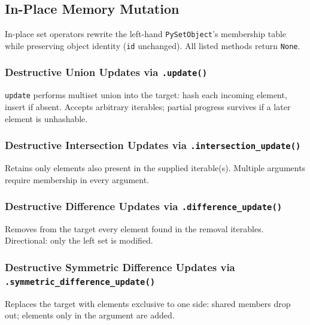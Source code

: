 \subsection{In-Place Memory Mutation}

In-place set operators rewrite the left-hand \texttt{PySetObject}'s membership table while preserving object identity (\texttt{id} unchanged). All listed methods return \texttt{None}.

\subsubsection{Destructive Union Updates via \texttt{.update()}}

\texttt{update} performs multiset union into the target: hash each incoming element, insert if absent. Accepts arbitrary iterables; partial progress survives if a later element is unhashable.

\subsubsection{Destructive Intersection Updates via \texttt{.intersection\_update()}}

Retains only elements also present in the supplied iterable(s). Multiple arguments require membership in every argument.

\subsubsection{Destructive Difference Updates via \texttt{.difference\_update()}}

Removes from the target every element found in the removal iterables. Directional: only the left set is modified.

\subsubsection{Destructive Symmetric Difference Updates via \texttt{.symmetric\_difference\_update()}}

Replaces the target with elements exclusive to one side: shared members drop out; elements only in the argument are added.
